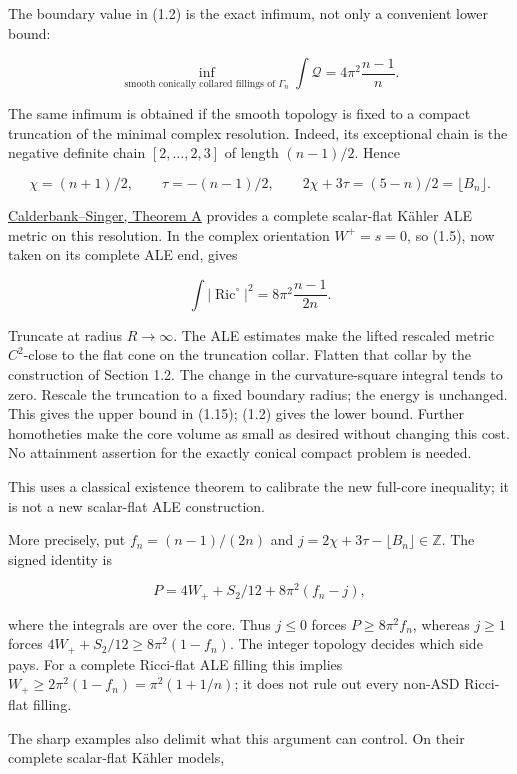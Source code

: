 \documentclass[
  10pt,
]{article}
\begin{document}
The boundary value in (1.2) is the exact infimum, not only a convenient
lower bound:

\[
 \boxed{\inf_{\text{smooth conically collared fillings of }\Gamma_n}
                   \int\mathscr Q=4\pi^2\frac{n-1}{n}.}        \tag{1.15}
\]

The same infimum is obtained if the smooth topology is fixed to a
compact truncation of the minimal complex resolution. Indeed, its
exceptional chain is the negative definite chain \([2,\ldots,2,3]\) of
length \((n-1)/2\). Hence

\[
 \chi=(n+1)/2,\qquad \tau=-(n-1)/2,\qquad
                 2\chi+3\tau=(5-n)/2=\lfloor B_n\rfloor.
\]

\href{https://arxiv.org/pdf/math/0206229}{Calderbank--Singer, Theorem A}
provides a complete scalar-flat Kähler ALE metric on this resolution. In
the complex orientation \(W^+=s=0\), so (1.5), now taken on its complete
ALE end, gives

\[
 \int|\operatorname{Ric}^{\circ}|^2
                 =8\pi^2\frac{n-1}{2n}.             \tag{1.16}
\]

Truncate at radius \(R\to\infty\). The ALE estimates make the lifted
rescaled metric \(C^2\)-close to the flat cone on the truncation collar.
Flatten that collar by the construction of Section 1.2. The change in
the curvature-square integral tends to zero. Rescale the truncation to a
fixed boundary radius; the energy is unchanged. This gives the upper
bound in (1.15); (1.2) gives the lower bound. Further homotheties make
the core volume as small as desired without changing this cost. No
attainment assertion for the exactly conical compact problem is needed.

This uses a classical existence theorem to calibrate the new full-core
inequality; it is not a new scalar-flat ALE construction.

More precisely, put \(f_n=(n-1)/(2n)\) and
\(j=2\chi+3\tau-\lfloor B_n\rfloor\in\mathbb Z\). The signed identity is

\[
 P=4W_++S_2/12+8\pi^2(f_n-j),                       \tag{1.17}
\]

where the integrals are over the core. Thus \(j\le0\) forces
\(P\ge8\pi^2f_n\), whereas \(j\ge1\) forces
\(4W_++S_2/12\ge8\pi^2(1-f_n)\). The integer topology decides which side
pays. For a complete Ricci-flat ALE filling this implies
\(W_+\ge2\pi^2(1-f_n)=\pi^2(1+1/n)\); it does not rule out every non-ASD
Ricci-flat filling.

The sharp examples also delimit what this argument can control. On their
complete scalar-flat Kähler models,
\end{document}
